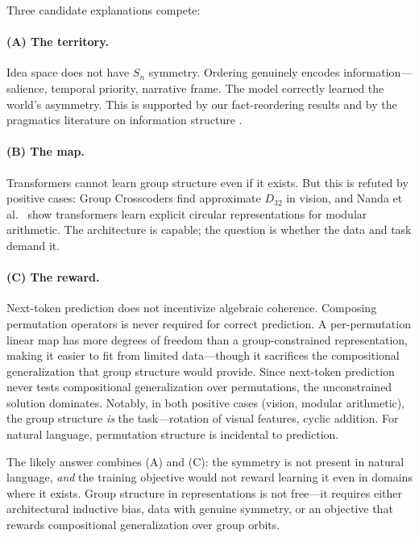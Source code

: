 \documentclass[10pt, letterpaper]{article}
\begin{document}
Three candidate explanations compete:

\paragraph{(A) The territory.} Idea space does not have $S_n$ symmetry. Ordering genuinely encodes information---salience, temporal priority, narrative frame. The model correctly learned the world's asymmetry. This is supported by our fact-reordering results and by the pragmatics literature on information structure \cite{krifka2008, lambrecht1994}.

\paragraph{(B) The map.} Transformers cannot learn group structure even if it exists. But this is refuted by positive cases: Group Crosscoders \cite{gorton2024group} find approximate $D_{32}$ in vision, and Nanda et al.\ \cite{nanda2023grokking} show transformers learn explicit circular representations for modular arithmetic. The architecture is capable; the question is whether the data and task demand it.

\paragraph{(C) The reward.} Next-token prediction does not incentivize algebraic coherence. Composing permutation operators is never required for correct prediction. A per-permutation linear map has more degrees of freedom than a group-constrained representation, making it easier to fit from limited data---though it sacrifices the compositional generalization that group structure would provide. Since next-token prediction never tests compositional generalization over permutations, the unconstrained solution dominates. Notably, in both positive cases (vision, modular arithmetic), the group structure \emph{is} the task---rotation of visual features, cyclic addition. For natural language, permutation structure is incidental to prediction.

The likely answer combines (A) and (C): the symmetry is not present in natural language, \emph{and} the training objective would not reward learning it even in domains where it exists. Group structure in representations is not free---it requires either architectural inductive bias, data with genuine symmetry, or an objective that rewards compositional generalization over group orbits.
\end{document}
